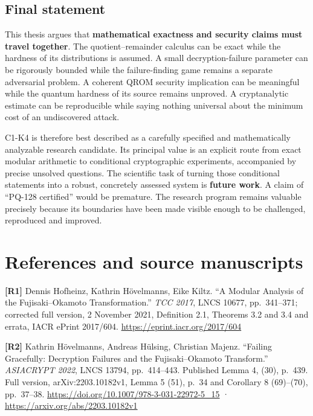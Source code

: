 \documentclass[
  11pt,
  a4paper,
  oneside]{report}
\begin{document}
\section{Final statement}\label{final-statement}

This thesis argues that \textbf{mathematical exactness and security
claims must travel together}. The quotient--remainder calculus can be
exact while the hardness of its distributions is assumed. A small
decryption-failure parameter can be rigorously bounded while the
failure-finding game remains a separate adversarial problem. A coherent
QROM security implication can be meaningful while the quantum hardness
of its source remains unproved. A cryptanalytic estimate can be
reproducible while saying nothing universal about the minimum cost of an
undiscovered attack.

C1-K4 is therefore best described as a carefully specified and
mathematically analyzable research candidate. Its principal value is an
explicit route from exact modular arithmetic to conditional
cryptographic experiments, accompanied by precise unsolved questions.
The scientific task of turning those conditional statements into a
robust, concretely assessed system is \textbf{future work}. A claim of
``PQ-128 certified'' would be premature. The research program remains
valuable precisely because its boundaries have been made visible enough
to be challenged, reproduced and improved.

\chapter*{References and source
manuscripts}\label{references-and-source-manuscripts}

\textbf{{[}R1{]}} Dennis Hofheinz, Kathrin Hövelmanns, Eike Kiltz. ``A
Modular Analysis of the Fujisaki--Okamoto Transformation.'' \emph{TCC
2017}, LNCS 10677, pp.~341--371; corrected full version, 2 November
2021, Definition 2.1, Theorems 3.2 and 3.4 and errata, IACR ePrint
2017/604. \url{https://eprint.iacr.org/2017/604}

\textbf{{[}R2{]}} Kathrin Hövelmanns, Andreas Hülsing, Christian Majenz.
``Failing Gracefully: Decryption Failures and the Fujisaki--Okamoto
Transform.'' \emph{ASIACRYPT 2022}, LNCS 13794, pp.~414--443. Published
Lemma 4, (30), p.~439. Full version, arXiv:2203.10182v1, Lemma 5 (51),
p.~34 and Corollary 8 (69)--(70), pp.~37--38.
\url{https://doi.org/10.1007/978-3-031-22972-5_15} ·
\url{https://arxiv.org/abs/2203.10182v1}
\end{document}
